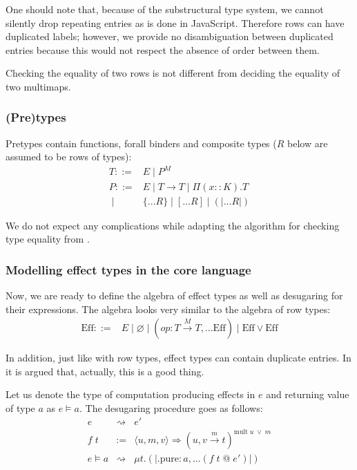 \documentclass[conference]{IEEEtran}
\begin{document}
One should note that, because of the substructural type system, we cannot
silently drop repeating entries as is done in JavaScript. Therefore rows can
have duplicated labels; however, we provide no disambiguation between duplicated
entries because this would not respect the absence of order between them.

Checking the equality of two rows is not different from deciding the equality of
two multimaps.

\subsubsection{(Pre)types}

Pretypes contain functions, forall binders and composite types ($R$ below are
assumed to be rows of types):
\[
    \begin{array}{rl}
        T ::=& E \;|\; P^M \\
        P ::=& E \;|\; T \to T \;|\; \Pi (x :: K). T \\
        \;|\;& \{...R\} \;|\; [...R] \;|\; (|...R|)
    \end{array}
\]

We do not expect any complications while adapting the algorithm for checking
type equality from \cite{stone}.

\subsubsection{Modelling effect types in the core language}

Now, we are ready to define the algebra of effect types as well as desugaring
for their expressions. The algebra looks very similar to the algebra of row
types:
\[
    \begin{array}{rl}
        \text{Eff} ::=& E \;|\; \varnothing
            \;|\; (op : T \xrightarrow{M} T, ...\text{Eff})
            \;|\; \text{Eff} \lor \text{Eff}
    \end{array}
\]

In addition, just like with row types, effect types can contain duplicate
entries. In \cite{rowkoka} it is argued that, actually, this is a good thing.

Let us denote the type of computation producing effects in $e$ and returning
value of type $a$ as $e \models a$. The desugaring procedure goes as follows:
\begin{equation}
    \begin{array}{rcl}
        e &\rightsquigarrow& e' \\
        f \; t &:=& \langle u, m, v \rangle \Rightarrow
            (u, v \xrightarrow{m} t)^{\text{mult}\;u \;\lor\; m} \\
        e \models a &\rightsquigarrow& \mu t.
            (| \text{.pure} : a, ...(f \; t \; @ \; e') |)
    \end{array}
\end{equation}
\end{document}
